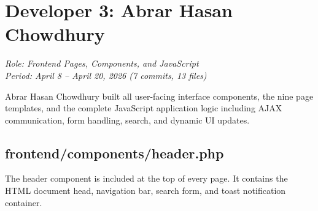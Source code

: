 \documentclass[12pt,a4paper]{report}
\begin{document}
\chapter{Developer 3: Abrar Hasan Chowdhury}
\textit{Role: Frontend Pages, Components, and JavaScript}\\
\textit{Period: April 8 -- April 20, 2026 (7 commits, 13 files)}

Abrar Hasan Chowdhury built all user-facing interface components, the nine page templates, and the complete JavaScript application logic including AJAX communication, form handling, search, and dynamic UI updates.

\section{frontend/components/header.php}
The header component is included at the top of every page. It contains the HTML document head, navigation bar, search form, and toast notification container.
\end{document}
